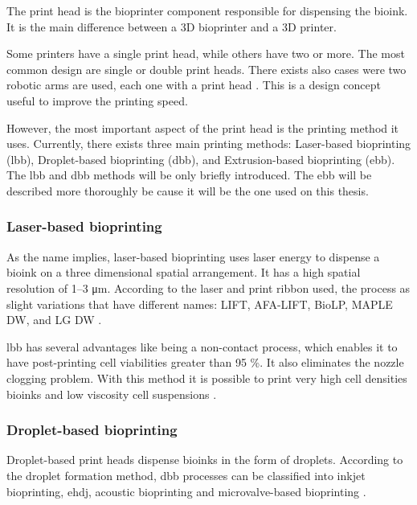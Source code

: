 The print head is the bioprinter component responsible for dispensing the bioink. It is the main difference between a 3D bioprinter and a 3D printer.

Some printers have a single print head, while others have two or more. The most common design are single or double print heads. There exists also cases were two robotic arms are used, each one with a print head \cite{Ozbolat2014_multi_arm_bioprinter}. This is a design concept useful to improve the printing speed.

However, the most important aspect of the print head is the printing method it uses. Currently, there exists three main printing methods: Laser-based bioprinting (\gls{lbb}), Droplet-based bioprinting (\gls{dbb}), and Extrusion-based bioprinting (\gls{ebb}). The \gls{lbb} and \gls{dbb} methods will be only briefly introduced. The \gls{ebb} will be described more thoroughly be cause it will be the one used on this thesis.

\subsubsection{Laser-based bioprinting}
\label{subsubsec:laser_based_bioprinting}

As the name implies, laser-based bioprinting uses laser energy to dispense a bioink on a three dimensional spatial arrangement. It has a high spatial resolution of \numrange{1}{3} \si{\micro\meter}. According to the laser and print ribbon used, the process as slight variations that have different names: LIFT, AFA-LIFT, BioLP, MAPLE DW, and LG DW \cite{Vijayavenkataraman2018_bioprinting_tissues_organs_regen_med}.

\gls{lbb} has several advantages like being a non-contact process, which enables it to have post-printing cell viabilities greater than 95 \%. It also eliminates the nozzle clogging problem. With this method it is possible to print very high cell densities bioinks and low viscosity cell suspensions \cite{Vijayavenkataraman2018_bioprinting_tissues_organs_regen_med}.


\subsubsection{Droplet-based bioprinting}
\label{subsubsec:droplet_based_bioprinting}

Droplet-based print heads dispense bioinks in the form of droplets. According to the droplet formation method, \gls{dbb} processes can be classified into inkjet bioprinting, \gls{ehdj}, acoustic bioprinting and microvalve-based bioprinting \cite{Vijayavenkataraman2018_bioprinting_tissues_organs_regen_med}.

